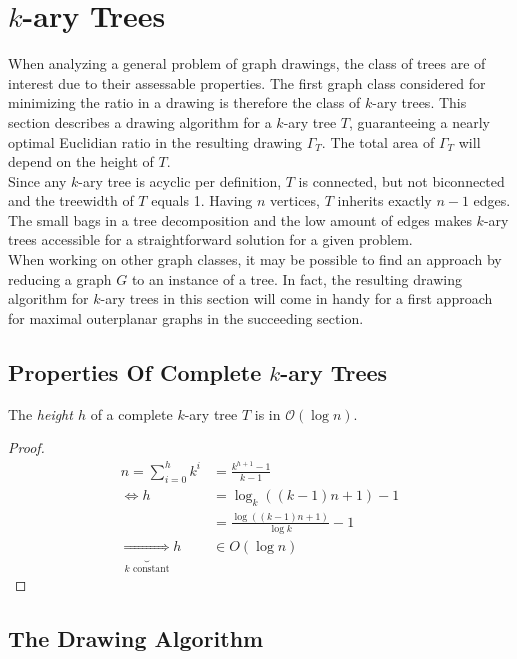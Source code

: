 \section{$k$-ary Trees}\label{s:k-ary_trees}
When analyzing a general problem of graph drawings, the class of trees are of interest due to their assessable properties. The first graph class considered for minimizing the ratio in a drawing is therefore the class of $k$-ary trees. This section describes a drawing algorithm for a $k$-ary tree $T$, guaranteeing a nearly optimal Euclidian ratio in the resulting drawing $\Gamma_T$. The total area of $\Gamma_T$ will depend on the height of $T$.\\
Since any $k$-ary tree is acyclic per definition, $T$ is connected, but not biconnected and the treewidth of $T$ equals 1. Having $n$ vertices, $T$ inherits exactly $n-1$ edges. The small bags in a tree decomposition and the low amount of edges makes $k$-ary trees accessible for a straightforward solution for a given problem.\\
When working on other graph classes, it may be possible to find an approach by reducing a graph $G$ to an instance of a tree. In fact, the resulting drawing algorithm for $k$-ary trees in this section will come in handy for a first approach for maximal outerplanar graphs in the succeeding section.
\subsection{Properties Of Complete $k$-ary Trees}
\begin{lemma}The \emph{height $h$} of a complete $k$-ary tree $T$ is in $\mathcal{O}(\log n)$.\label{l:k-ary-tree_log_height}
\end{lemma}
\begin{proof}
	\begin{align}
		n = \sum_{i=0}^{h}k^i &= \frac{k^{h+1}-1}{k-1}\\
		\Leftrightarrow h &= \log_k((k-1)n+1)-1\\
		&= \frac{\log((k-1)n+1)}{\log k}-1\\
		\underbrace{\Rightarrow}_{k \text{ constant}}h &\in O(\log n)
	\end{align}
\end{proof}

\subsection{The Drawing Algorithm}


